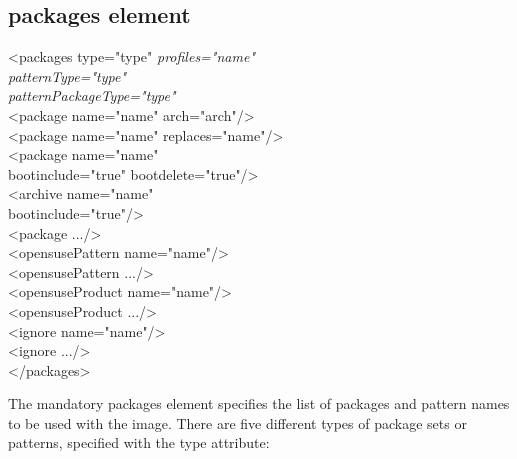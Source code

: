 \subsection{packages element}
\begin{Command}{12cm}
<packages type="type" \textit{profiles="name"}\\
\hspace*{2.5cm}\textit{patternType="type"}\\
\hspace*{2.5cm}\textit{patternPackageType="type"}\\
\hspace*{1cm}<package name="name" arch="arch"/>\\
\hspace*{1cm}<package name="name" replaces="name"/>\\
\hspace*{1cm}<package name="name"\\
\hspace*{2.5cm}bootinclude="true" bootdelete="true"/>\\
\hspace*{1cm}<archive name="name"\\
\hspace*{2.5cm}bootinclude="true"/>\\
\hspace*{1cm}<package .../>\\
\hspace*{1cm}<opensusePattern name="name"/>\\
\hspace*{1cm}<opensusePattern .../>\\
\hspace*{1cm}<opensuseProduct name="name"/>\\
\hspace*{1cm}<opensuseProduct .../>\\
\hspace*{1cm}<ignore name="name"/>\\
\hspace*{1cm}<ignore .../>\\
</packages>
\end{Command}

The mandatory packages element specifies the list of packages and
pattern names to be used with the image. There are five different
types of package sets or patterns, specified with the type attribute:

